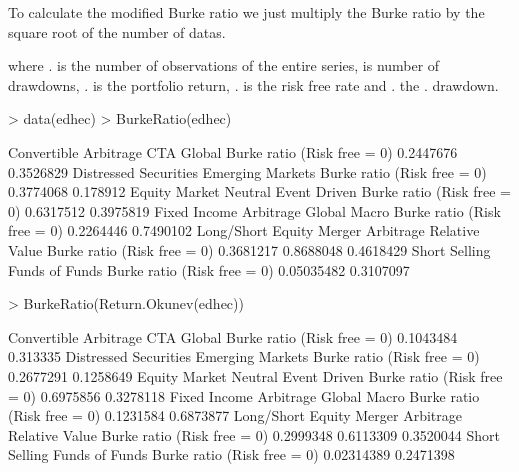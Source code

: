 \documentclass[12pt,letterpaper,english]{article}
\begin{document}
To calculate the modified Burke ratio we just multiply the Burke ratio by the square root of the number of datas.


where . is the number of observations of the entire series,  is number of drawdowns, . is the portfolio return, . is the risk free rate and . the . drawdown.

\begin{Schunk}
\begin{Sinput}
> data(edhec)
> BurkeRatio(edhec)
\end{Sinput}
\begin{Soutput}
                            Convertible Arbitrage CTA Global
Burke ratio (Risk free = 0)             0.2447676  0.3526829
                            Distressed Securities Emerging Markets
Burke ratio (Risk free = 0)             0.3774068         0.178912
                            Equity Market Neutral Event Driven
Burke ratio (Risk free = 0)             0.6317512    0.3975819
                            Fixed Income Arbitrage Global Macro
Burke ratio (Risk free = 0)              0.2264446    0.7490102
                            Long/Short Equity Merger Arbitrage Relative Value
Burke ratio (Risk free = 0)         0.3681217        0.8688048      0.4618429
                            Short Selling Funds of Funds
Burke ratio (Risk free = 0)    0.05035482      0.3107097
\end{Soutput}
\begin{Sinput}
> BurkeRatio(Return.Okunev(edhec))
\end{Sinput}
\begin{Soutput}
                            Convertible Arbitrage CTA Global
Burke ratio (Risk free = 0)             0.1043484   0.313335
                            Distressed Securities Emerging Markets
Burke ratio (Risk free = 0)             0.2677291        0.1258649
                            Equity Market Neutral Event Driven
Burke ratio (Risk free = 0)             0.6975856    0.3278118
                            Fixed Income Arbitrage Global Macro
Burke ratio (Risk free = 0)              0.1231584    0.6873877
                            Long/Short Equity Merger Arbitrage Relative Value
Burke ratio (Risk free = 0)         0.2999348        0.6113309      0.3520044
                            Short Selling Funds of Funds
Burke ratio (Risk free = 0)    0.02314389      0.2471398
\end{Soutput}
\end{Schunk}
\end{document}
